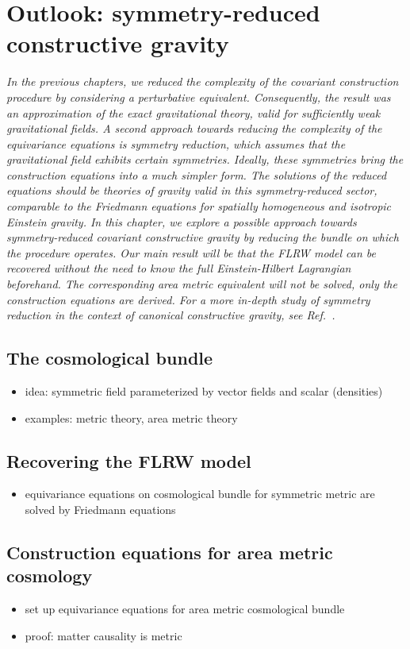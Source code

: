 \chapter{Outlook: symmetry-reduced constructive gravity}\label{chapter_cosmo}

\textit{In the previous chapters, we reduced the complexity of the covariant construction procedure by considering a perturbative equivalent. Consequently, the result was an approximation of the exact gravitational theory, valid for sufficiently weak gravitational fields. A second approach towards reducing the complexity of the equivariance equations is symmetry reduction, which assumes that the gravitational field exhibits certain symmetries. Ideally, these symmetries bring the construction equations into a much simpler form. The solutions of the reduced equations should be theories of gravity valid in this symmetry-reduced sector, comparable to the Friedmann equations for spatially homogeneous and isotropic Einstein gravity. In this chapter, we explore a possible approach towards symmetry-reduced covariant constructive gravity by reducing the bundle on which the procedure operates. Our main result will be that the FLRW model can be recovered without the need to know the full Einstein-Hilbert Lagrangian beforehand. The corresponding area metric equivalent will not be solved, only the construction equations are derived. For a more in-depth study of symmetry reduction in the context of canonical constructive gravity, see Ref.~\cite{Duell_2020}.}

\section{The cosmological bundle}
\begin{itemize}
\item idea: symmetric field parameterized by vector fields and scalar (densities)
\item examples: metric theory, area metric theory
\end{itemize}

\section{Recovering the FLRW model}
\begin{itemize}
\item equivariance equations on cosmological bundle for symmetric metric are solved by Friedmann equations
\end{itemize}

\section{Construction equations for area metric cosmology}
\begin{itemize}
\item set up equivariance equations for area metric cosmological bundle
\item proof: matter causality is metric
\end{itemize}

